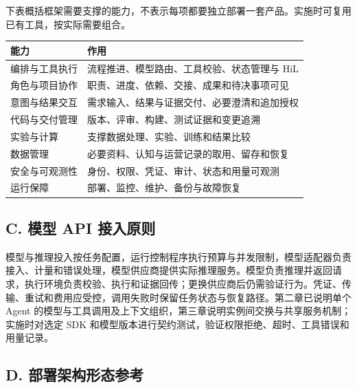 \documentclass[11pt,a4paper]{article}
\begin{document}
下表概括框架需要支撑的能力，不表示每项都要独立部署一套产品。实施时可复用已有工具，按实际需要组合。

\begin{table}[H]
\centering\small
\renewcommand{\arraystretch}{1.25}
\begin{tabularx}{\textwidth}{P{3.5cm} L}
\toprule
\textbf{能力} & \textbf{作用} \\
\midrule
编排与工具执行 & 流程推进、模型路由、工具校验、状态管理与 HiL \\
角色与项目协作 & 职责、进度、依赖、交接、成果和待决事项可见 \\
意图与结果交互 & 需求输入、结果与证据交付、必要澄清和追加授权 \\
代码与交付管理 & 版本、评审、构建、测试证据和变更追溯 \\
实验与计算 & 支撑数据处理、实验、训练和结果比较 \\
数据管理 & 必要资料、认知与运营记录的取用、留存和恢复 \\
安全与可观测性 & 身份、权限、凭证、审计、状态和用量可观测 \\
运行保障 & 部署、监控、维护、备份与故障恢复 \\
\bottomrule
\end{tabularx}
\end{table}

\subsection*{C. 模型 API 接入原则}

模型与推理投入按任务配置，运行控制程序执行预算与并发限制，模型适配器负责接入、计量和错误处理，模型供应商提供实际推理服务。模型负责推理并返回请求，执行环境负责校验、执行和证据回传；更换供应商后仍需验证行为。凭证、传输、重试和费用应受控，调用失败时保留任务状态与恢复路径。第二章已说明单个 Agent 的模型与工具调用及上下文组织，第三章说明实例间交换与共享服务机制；实施时对选定 SDK 和模型版本进行契约测试，验证权限拒绝、超时、工具错误和用量记录。

\subsection*{D. 部署架构形态参考}
\label{app:deployment}
\begingroup\renewcommand{\thesection}{D}\renewcommand{\theHsection}{appendixD}\setcounter{subsection}{0}
\end{document}
